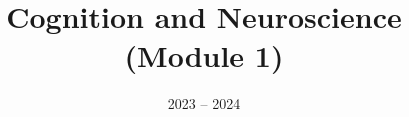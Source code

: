 \documentclass[11pt]{ainotes}
\title{Cognition and Neuroscience\\(Module 1)}
\date{2023 -- 2024}
\begin{document}
    
    \makenotesfront
    \printacronyms
    \newpage

    
    
    
    
    
    \eoc
    
\end{document}
